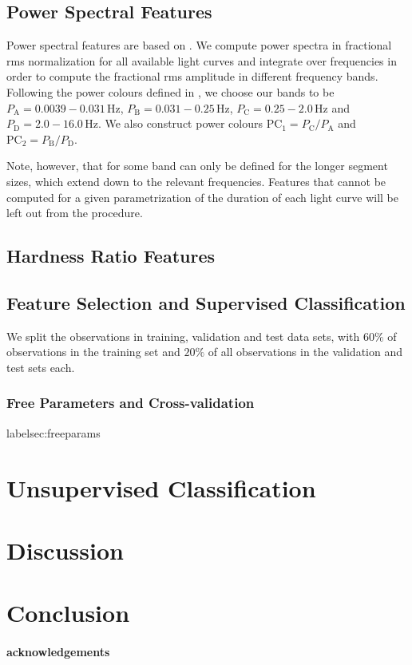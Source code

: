 \documentclass[12pt]{emulateapj}
\begin{document}
\subsection{Power Spectral Features}

Power spectral features are based on \citep{heil2014}. We compute power spectra in fractional rms normalization for all available light curves and integrate over frequencies in order to compute the fractional rms amplitude in different frequency bands. 
Following the power colours defined in \citet{heil2014}, we choose our bands to be $P_\mathrm{A} = 0.0039-0.031 \,\mathrm{Hz}$, 
$P_\mathrm{B} = 0.031-0.25 \,\mathrm{Hz}$, $P_\mathrm{C} =  0.25-2.0 \,\mathrm{Hz}$ and $P_\mathrm{D} = 2.0-16.0 \,\mathrm{Hz}$. We also construct power colours $\mathrm{PC}_1 = P_\mathrm{C}/P_\mathrm{A}$ and  $\mathrm{PC}_2 = P_\mathrm{B}/P_\mathrm{D}$.

Note, however, that for some band can only be defined for the longer segment sizes, which extend down to the relevant frequencies. Features 
that cannot be computed for a given parametrization of the duration of each light curve will be left out from the procedure.

\subsection{Hardness Ratio Features}



\subsection{Feature Selection and Supervised Classification}
We split the observations in training, validation and test data sets, with $60\%$ of observations in the training set and $20\%$ of all observations in the validation and test sets each. 

\subsubsection{Free Parameters and Cross-validation}
label{sec:freeparams}


\section{Unsupervised Classification}


\section{Discussion}


\section{Conclusion}

\paragraph{acknowledgements}

%
%
\end{document}
